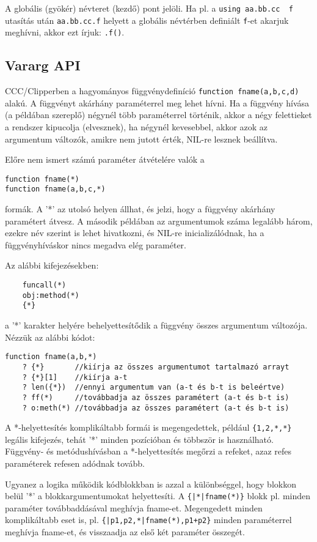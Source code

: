 A globális (gyökér) névteret (kezdő) pont jelöli. 
Ha pl. a \verb!using aa.bb.cc  f! utasítás után 
\verb!aa.bb.cc.f! helyett a globális névtérben definiált 
\verb!f!-et akarjuk meghívni, akkor ezt írjuk: \verb!.f()!.

\label{VARARG}
\subsection{Vararg API}

CCC/Clipperben a hagyományos függvénydefiníció
\verb!function fname(a,b,c,d)! alakú. 
A függvényt akárhány paraméterrel meg lehet hívni.
Ha a függvény hívása (a példában szereplő) négynél több paraméterrel 
történik,  akkor a négy felettieket a rendszer kipucolja (elvesznek), 
ha négynél kevesebbel, akkor azok az argumentum változók,
amikre nem jutott érték, NIL-re lesznek beállítva.

Előre nem ismert számú paraméter átvételére valók a
\begin{verbatim}
function fname(*)
function fname(a,b,c,*)
\end{verbatim}
formák. A '*' az utolsó helyen állhat, és jelzi, hogy a függvény
akárhány paramétert átvesz. A második példában az argumentumok
száma legalább három, ezekre név szerint is lehet hivatkozni,
és NIL-re inicializálódnak, ha a függvényhíváskor nincs  megadva
elég paraméter.

Az alábbi kifejezésekben:
\begin{verbatim}
    funcall(*)
    obj:method(*)
    {*}
\end{verbatim}
a '*' karakter helyére behelyettesítődik a függvény összes
argumentum változója. Nézzük az alábbi kódot:
\begin{verbatim}
function fname(a,b,*)
    ? {*}       //kiírja az összes argumentumot tartalmazó arrayt
    ? {*}[1]    //kiírja a-t
    ? len({*})  //ennyi argumentum van (a-t és b-t is beleértve)
    ? ff(*)     //továbbadja az összes paramétert (a-t és b-t is)
    ? o:meth(*) //továbbadja az összes paramétert (a-t és b-t is)
\end{verbatim}
A *-helyettesítés komplikáltabb formái is megengedettek, például
\verb!{1,2,*,*}! legális kifejezés, tehát '*' minden pozícióban
és többször is  használható. 
Függvény- és metódushívásban a *-helyettesítés megőrzi
a refeket, azaz refes paraméterek refesen adódnak tovább.

Ugyanez a logika működik kódblokkban is azzal a különbséggel,
hogy blokkon belül '*' a blokkargumentumokat helyettesíti.
A \verb!{|*|fname(*)}! blokk pl. minden paraméter továbbaddásával
meghívja fname-et. Megengedett minden komplikáltabb eset is, pl.
\verb!{|p1,p2,*|fname(*),p1+p2}! minden paraméterrel meghívja
fname-et, és visszaadja az első két paraméter összegét.

